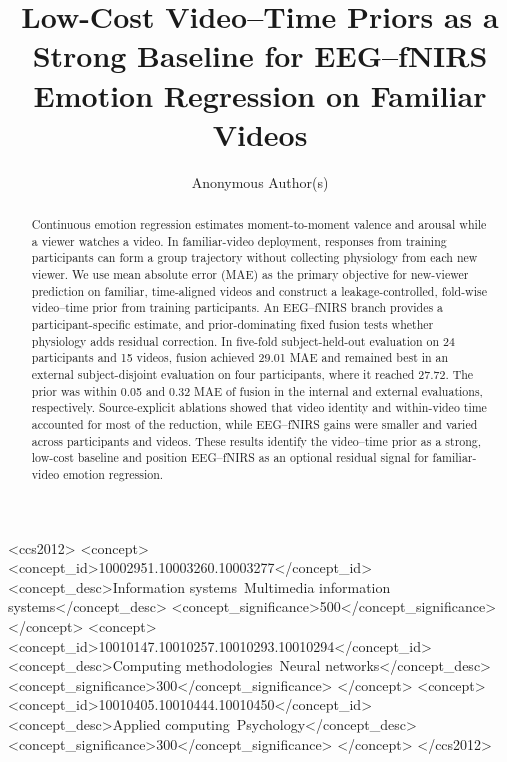 \documentclass[sigconf,screen,review,anonymous]{acmart}
\begin{document}
\title{Low-Cost Video--Time Priors as a Strong Baseline for EEG--fNIRS Emotion Regression on Familiar Videos}

\author{Anonymous Author(s)}
\email{}

\begin{abstract}
Continuous emotion regression estimates moment-to-moment valence and arousal
while a viewer watches a video. In familiar-video deployment, responses from
training participants can form a group trajectory without collecting physiology
from each new viewer. We use mean absolute error (MAE) as the primary objective
for new-viewer prediction on familiar, time-aligned videos and construct a
leakage-controlled, fold-wise video--time prior from training participants. An
EEG--fNIRS branch provides a participant-specific estimate, and
prior-dominating fixed fusion tests whether physiology adds residual correction.
In five-fold subject-held-out evaluation on 24 participants and 15 videos,
fusion achieved 29.01 MAE and remained best in an external subject-disjoint
evaluation on four participants, where it reached 27.72. The prior was
within 0.05 and 0.32 MAE of fusion in the internal and external evaluations,
respectively.
Source-explicit ablations showed that video identity and within-video time
accounted for most of the reduction, while EEG--fNIRS gains were smaller and
varied across participants and videos. These results identify the video--time
prior as a strong, low-cost baseline and position EEG--fNIRS as an optional
residual signal for familiar-video emotion regression.
\end{abstract}

\begin{CCSXML}
<ccs2012>
  <concept>
    <concept_id>10002951.10003260.10003277</concept_id>
    <concept_desc>Information systems~Multimedia information systems</concept_desc>
    <concept_significance>500</concept_significance>
  </concept>
  <concept>
    <concept_id>10010147.10010257.10010293.10010294</concept_id>
    <concept_desc>Computing methodologies~Neural networks</concept_desc>
    <concept_significance>300</concept_significance>
  </concept>
  <concept>
    <concept_id>10010405.10010444.10010450</concept_id>
    <concept_desc>Applied computing~Psychology</concept_desc>
    <concept_significance>300</concept_significance>
  </concept>
</ccs2012>
\end{CCSXML}



\maketitle



\clearpage
\balance


\end{document}
